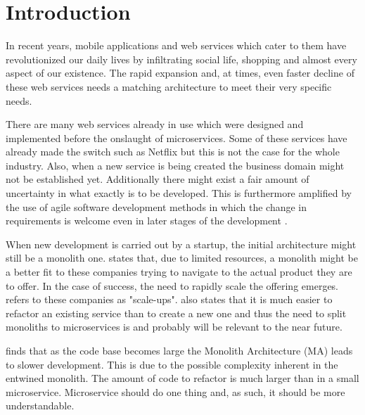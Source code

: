 

\section{Introduction}
\begin{sloppypar}
    In recent years, mobile applications and web services which cater to them
    have revolutionized our daily lives by infiltrating social life, shopping
    and almost every aspect of our existence. The rapid expansion and, at times,
    even faster decline of these web services needs a matching architecture to
    meet their very specific needs.
\end{sloppypar}
\begin{sloppypar}
    There are many web services already in use which were designed and
    implemented before the onslaught of microservices. Some of these services
    have already made the switch such as Netflix but this is not the case for
    the whole industry. Also, when a new service is being created the business
    domain might not be established yet. Additionally there might exist a fair
    amount of uncertainty in what exactly is to be developed. This is
    furthermore amplified by the use of agile software development methods in
    which the change in requirements is welcome even in later stages of the
    development \citep{agilemanifesto}.
\end{sloppypar}
\begin{sloppypar}
    When new development is carried out by a startup, the initial architecture
    might still be a monolith one. \citet{newman2019} states that, due to
    limited resources, a monolith might be a better fit to these companies
    trying to navigate to the actual product they are to offer. In the case of
    success, the need to rapidly scale the offering emerges. \citet{newman2019}
    refers to these companies as "scale-ups". \citet{newman2019} also states
    that it is much easier to refactor an existing service than to create a new
    one and thus the need to split monoliths to microservices is and probably
    will be relevant to the near future.
\end{sloppypar}
\begin{sloppypar}
    \citet{10.1007/978-3-319-74433-9_3} finds that as the code base becomes large
    the Monolith Architecture (MA) leads to slower development. This is due to
    the possible complexity inherent in the entwined monolith. The amount of
    code to refactor is much larger than in a small microservice. Microservice
    should do one thing and, as such, it should be more understandable.
\end{sloppypar}

